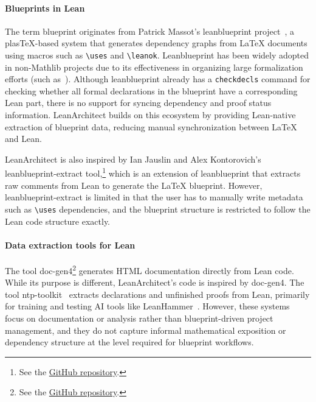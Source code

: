\documentclass{article}
\newcommand{\leanarchitect}{LeanArchitect\xspace}
\newcommand{\leanblueprint}{leanblueprint\xspace}
\newcommand\latexcode{\lstinline[language={[latex]tex},keywordstyle=\ttfamily\color{black}]}
\newcommand\leancode{\lstinline[language=lean]}
\begin{document}
\paragraph{Blueprints in Lean}
The term blueprint originates from Patrick Massot's \leanblueprint project~\cite{massot_leanblueprint}, a plas\TeX{}-based system that generates dependency graphs from \LaTeX{} documents using macros such as \latexcode{\uses} and \latexcode{\leanok}. Leanblueprint has been widely adopted in non-Mathlib projects due to its effectiveness in organizing large formalization efforts (such as~\cite{fvp_carleson, buzzard_flt, riehl_infinity-cosmos, kontorovich_pnt, degenne2025brownian, tao2025equational}). Although \leanblueprint already has a \leancode{checkdecls} command for checking whether all formal declarations in the blueprint have a corresponding Lean part, there is no support for syncing dependency and proof status information. \leanarchitect builds on this ecosystem by providing Lean-native extraction of blueprint data, reducing manual synchronization between \LaTeX{} and Lean.

\leanarchitect is also inspired by Ian Jauslin and Alex Kontorovich's \leanblueprint-extract tool,\footnote{See the \href{https://github.com/AlexKontorovich/PrimeNumberTheoremAnd/tree/d89e0d9/leanblueprint-extract}{GitHub repository}.} which is an extension of \leanblueprint that extracts raw comments from Lean to generate the \LaTeX{} blueprint. However, \leanblueprint-extract is limited in that the user has to manually write metadata such as \latexcode{\uses} dependencies, and the blueprint structure is restricted to follow the Lean code structure exactly.

\paragraph{Data extraction tools for Lean}
The tool doc-gen4\footnote{See the \href{https://github.com/leanprover/doc-gen4}{GitHub repository}.} generates HTML documentation directly from Lean code. While its purpose is different, \leanarchitect's code is inspired by doc-gen4. The tool ntp-toolkit~\cite{hu2024minictx} extracts declarations and unfinished proofs from Lean, primarily for training and testing AI tools like LeanHammer~\cite{zhu2025premise}. However, these systems focus on documentation or analysis rather than blueprint-driven project management, and they do not capture informal mathematical exposition or dependency structure at the level required for blueprint workflows.
\end{document}
